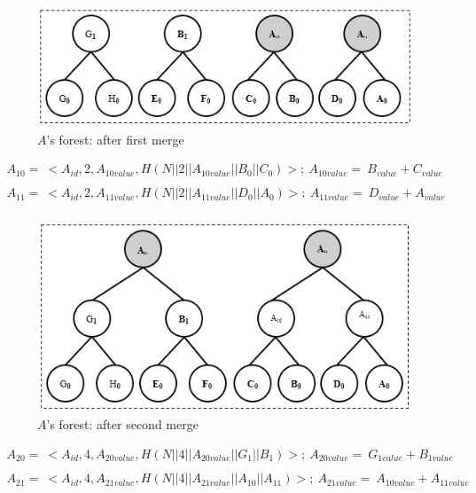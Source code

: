 \documentclass[%
  slidesonly,%
  semlayer%
  ]{seminar}                                  %
\begin{document}
\begin{slide}
      \begin{figure}[h!]
        \centering
        \includegraphics[scale = 0.5]{images/a-forest-first-merge.png}
        \caption{$A$'s forest: after first merge}
        \label{fig:a-forest-first-merge}
      \end{figure}
      \begin{tiny}
        \begin{equation*}
          \begin{array}{l}
            A_{10} =\ <A_{id},2,A_{10value},H(N||2||A_{10value}||B_{0}||C_{0})>;\ A_{10value} =\ B_{value} + C_{value}\\
            \\
            A_{11} =\ <A_{id},2,A_{11value},H(N||2||A_{11value}||D_{0}||A_{0})>;\ A_{11value} =\ D_{value} + A_{value}\\
          \end{array}     
        \end{equation*}
      \end{tiny}

      \begin{figure}[h!]
        \centering
        \includegraphics[scale = 0.5]{images/a-forest-second-merge.png}
        \caption{$A$'s forest: after second merge}
        \label{fig:a-forest-second-merge}
      \end{figure}

      \begin{tiny}
        \begin{equation*}
          \begin{array}{l}
            A_{20} =\ <A_{id},4,A_{20value},H(N||4||A_{20value}||G_{1}||B_{1})>;\ A_{20value} =\ G_{1value} + B_{1value}\\ 
            \\
            A_{21} =\ <A_{id},4,A_{21value},H(N||4||A_{21value}||A_{10}||A_{11})>;\ A_{21value} =\ A_{10value} + A_{11value}\\ 
          \end{array}
        \end{equation*}
      \end{tiny}


\end{slide}
\end{document}
